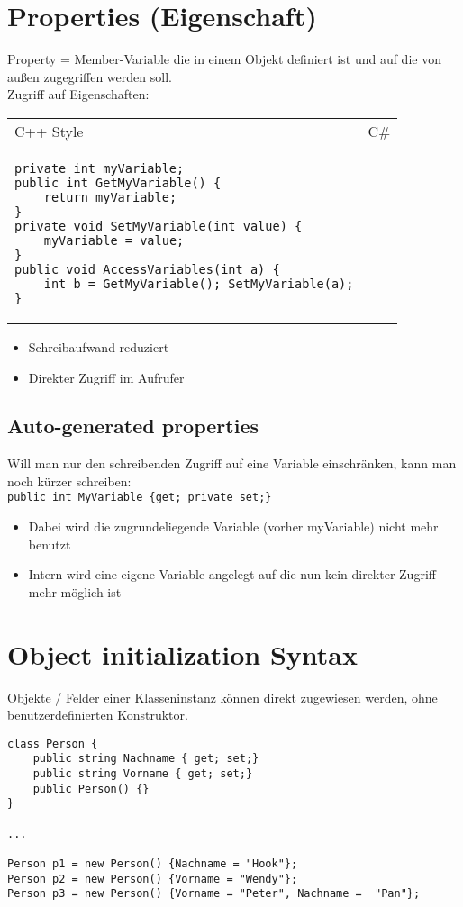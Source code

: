 \section{Properties (Eigenschaft)}
Property = Member-Variable die in einem Objekt definiert ist und auf die von außen zugegriffen werden soll.\\
Zugriff auf Eigenschaften: \\
\begin{tabular}{L{.5} L{.5}}
C++ Style &  C\#\\
\begin{lstlisting}[language={[Sharp]C}]
private int myVariable;
public int GetMyVariable() {
	return myVariable;
}
private void SetMyVariable(int value) {
	myVariable = value;
}
public void AccessVariables(int a) {
	int b = GetMyVariable(); SetMyVariable(a);
} 
\end{lstlisting} &
\begin{lstlisting}[language={[Sharp]C}]

\end{lstlisting}\\
\end{tabular}

\begin{itemize}
\item Schreibaufwand reduziert
\item Direkter Zugriff im Aufrufer
\end{itemize}

\subsection{Auto-generated properties}
Will man nur den schreibenden Zugriff auf eine Variable einschränken, kann man noch kürzer schreiben:\\
\lstinline$public int MyVariable {get; private set;}$
\begin{itemize}
\item Dabei wird die zugrundeliegende Variable (vorher myVariable) nicht mehr benutzt
\item Intern wird eine eigene Variable angelegt auf die nun kein direkter Zugriff mehr möglich ist
\end{itemize}

\section{Object initialization Syntax}

Objekte / Felder einer Klasseninstanz können direkt zugewiesen werden, ohne benutzerdefinierten Konstruktor.
\begin{lstlisting}[language={[Sharp]C}]
class Person { 
	public string Nachname { get; set;} 
	public string Vorname { get; set;} 
	public Person() {} 
}

...

Person p1 = new Person() {Nachname = "Hook"}; 
Person p2 = new Person() {Vorname = "Wendy"}; 
Person p3 = new Person() {Vorname = "Peter", Nachname =  "Pan"};
\end{lstlisting}

